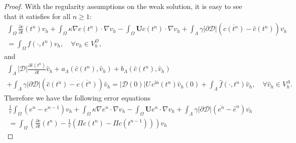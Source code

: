 \documentclass[pdflatex,sn-mathphys-num]{sn-jnl}%
\newcommand{\bfU}{{\boldsymbol U}}
\theoremstyle{thmstyleone}%
\theoremstyle{thmstyletwo}%
\theoremstyle{thmstylethree}%
\begin{document}
\begin{proof}
With the regularity assumptions on the weak solution, it is easy to see that it satisfies for all $n\geq 1$:
\begin{align*}
    \int_\Omega \frac{\partial c}{\partial t}(t^n)  v_h
      +   \int_\Omega  \kappa \nabla c(t^{n}) \cdot \nabla v_h  
      - \int_\Omega \bfU c(t^{n}) \cdot \nabla v_h
      +\int_\Lambda\gamma \vert \partial\mathcal{D}\vert \left(\overline{c(t^{n})}-\hat{c}(t^{n})\right)\overline{v_h}\nonumber\\
        = \int_\Omega f(\cdot,t^{n}) v_h, \quad \forall v_h \in V_h^\Omega,
\end{align*}
and
\begin{align*}
\int_\Lambda |\mathcal{D}| \frac{\partial\hat c(t^n)}{\partial  t} \hat v_h
    + a_\Lambda(\hat c(t^{n}), \hat v_h)
    + b_\Lambda(\hat c(t^{n}), \hat v_h)\nonumber\\
    +\int_\Lambda \gamma|\partial\mathcal{D}|\left(\hat c(t^{n})-\overline{c(t^{n})}\right)   \hat v_h
   =    
   |\mathcal{D}(0)|\hat U \, c^{\text{in}}(t^n) \hat v_h(0)
   + \int_\Lambda \hat f(\cdot, t^{n}) \hat v_h, \quad\forall \hat v_h \in V_h^\Lambda.
\end{align*}
Therefore we have the following error equations
\begin{align}
    \frac{1}{\tau}\int_\Omega (e^{n}-e^{n-1}) v_h
      +   \int_\Omega  \kappa \nabla e^{n} \cdot \nabla v_h
      - \int_\Omega \bfU e^{n} \cdot \nabla v_h
      +\int_\Lambda\gamma \vert \partial\mathcal{D}\vert \left(\overline{e^{n}}-\hat{e}^{n}\right)\overline{v_h}\nonumber\\
     = \int_\Omega \left(\frac{\partial c}{\partial t}(t^n) -\frac{1}{\tau} (\Pi c(t^{n})- \Pi c(t^{n-1})) \right)v_h

\end{align}
\end{proof}
\end{document}
